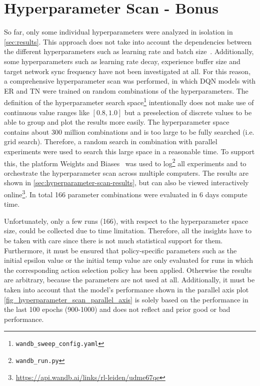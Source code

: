 \documentclass{article}
\begin{document}
\section{Hyperparameter Scan - Bonus}
\label{sec:bonus}
So far, only some individual hyperparameters were analyzed in isolation in \autoref{sec:results}.
This approach does not take into account the dependencies between the different hyperparameters 
such as learning rate and batch size~\cite{DBLP:conf/iclr/SmithKYL18}.
Additionally, some hyperparameters such as learning rate decay, experience buffer size and target network sync frequency have not been investigated at all.
For this reason, a comprehensive hyperparameter scan was performed, in which DQN models with ER and TN were trained on random combinations of the hyperparameters. 
The definition of the hyperparameter search space\footnote{\texttt{wandb\_sweep\_config.yaml}} 
intentionally does not make use of continuous value ranges like $[0.8, 1.0]$ but a preselection of discrete values to be able to group and plot the results more easily.
The hyperparameter space contains about 300 million combinations and is too large to be fully searched (i.e. grid search). 
Therefore, a random search in combination with parallel experiments were used to search this large space in a reasonable time.
To support this, the platform Weights and Biases~\cite{wandb} was used to log\footnote{\texttt{wandb\_run.py}} all experiments and to orchestrate the hyperparameter scan across multiple computers.
The results are shown in \autoref{sec:hyperparameter-scan-results},
but can also be viewed interactively online\footnote{\url{https://api.wandb.ai/links/rl-leiden/udme67qe}}. 
In total 166 parameter combinations were evaluated in 6 days compute time.


Unfortunately, only a few runs (166), with respect to the hyperparameter space size, could be collected due to time limitation.
Therefore, all the insights have to be taken with care since there is not much statistical support for them.
Furthermore, it must be ensured that policy-specific parameters such as the initial epsilon value or the initial temp value are only evaluated for runs in which the corresponding action selection policy has been applied. 
Otherwise the results are arbitrary, because the parameters are not used at all.
Additionally, it must be taken into account that the model's performance shown in the parallel axis plot 
\autoref{fig_hyperparameter_scan_parallel_axis} is solely based on the performance in the last 100 epochs (900-1000) 
and does not reflect and prior good or bad performance.
\end{document}
